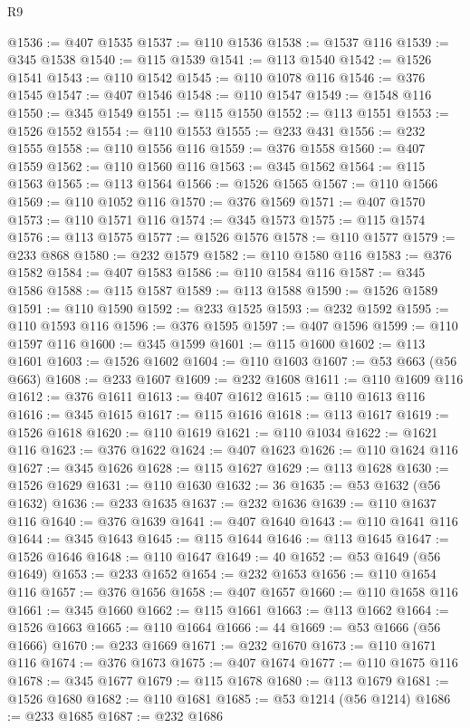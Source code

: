 \begin{lexlean}{R9}
\begin{coremodule}
@1536 := @407 @1535
@1537 := @110 @1536
@1538 := @1537 @116
@1539 := @345 @1538
@1540 := @115 @1539
@1541 := @113 @1540
@1542 := @1526 @1541
@1543 := @110 @1542
@1545 := @110 @1078 @116
@1546 := @376 @1545
@1547 := @407 @1546
@1548 := @110 @1547
@1549 := @1548 @116
@1550 := @345 @1549
@1551 := @115 @1550
@1552 := @113 @1551
@1553 := @1526 @1552
@1554 := @110 @1553
@1555 := @233 @431
@1556 := @232 @1555
@1558 := @110 @1556 @116
@1559 := @376 @1558
@1560 := @407 @1559
@1562 := @110 @1560 @116
@1563 := @345 @1562
@1564 := @115 @1563
@1565 := @113 @1564
@1566 := @1526 @1565
@1567 := @110 @1566
@1569 := @110 @1052 @116
@1570 := @376 @1569
@1571 := @407 @1570
@1573 := @110 @1571 @116
@1574 := @345 @1573
@1575 := @115 @1574
@1576 := @113 @1575
@1577 := @1526 @1576
@1578 := @110 @1577
@1579 := @233 @868
@1580 := @232 @1579
@1582 := @110 @1580 @116
@1583 := @376 @1582
@1584 := @407 @1583
@1586 := @110 @1584 @116
@1587 := @345 @1586
@1588 := @115 @1587
@1589 := @113 @1588
@1590 := @1526 @1589
@1591 := @110 @1590
@1592 := @233 @1525
@1593 := @232 @1592
@1595 := @110 @1593 @116
@1596 := @376 @1595
@1597 := @407 @1596
@1599 := @110 @1597 @116
@1600 := @345 @1599
@1601 := @115 @1600
@1602 := @113 @1601
@1603 := @1526 @1602
@1604 := @110 @1603
@1607 := @53 @663 (@56 @663)
@1608 := @233 @1607
@1609 := @232 @1608
@1611 := @110 @1609 @116
@1612 := @376 @1611
@1613 := @407 @1612
@1615 := @110 @1613 @116
@1616 := @345 @1615
@1617 := @115 @1616
@1618 := @113 @1617
@1619 := @1526 @1618
@1620 := @110 @1619
@1621 := @110 @1034
@1622 := @1621 @116
@1623 := @376 @1622
@1624 := @407 @1623
@1626 := @110 @1624 @116
@1627 := @345 @1626
@1628 := @115 @1627
@1629 := @113 @1628
@1630 := @1526 @1629
@1631 := @110 @1630
@1632 := 36
@1635 := @53 @1632 (@56 @1632)
@1636 := @233 @1635
@1637 := @232 @1636
@1639 := @110 @1637 @116
@1640 := @376 @1639
@1641 := @407 @1640
@1643 := @110 @1641 @116
@1644 := @345 @1643
@1645 := @115 @1644
@1646 := @113 @1645
@1647 := @1526 @1646
@1648 := @110 @1647
@1649 := 40
@1652 := @53 @1649 (@56 @1649)
@1653 := @233 @1652
@1654 := @232 @1653
@1656 := @110 @1654 @116
@1657 := @376 @1656
@1658 := @407 @1657
@1660 := @110 @1658 @116
@1661 := @345 @1660
@1662 := @115 @1661
@1663 := @113 @1662
@1664 := @1526 @1663
@1665 := @110 @1664
@1666 := 44
@1669 := @53 @1666 (@56 @1666)
@1670 := @233 @1669
@1671 := @232 @1670
@1673 := @110 @1671 @116
@1674 := @376 @1673
@1675 := @407 @1674
@1677 := @110 @1675 @116
@1678 := @345 @1677
@1679 := @115 @1678
@1680 := @113 @1679
@1681 := @1526 @1680
@1682 := @110 @1681
@1685 := @53 @1214 (@56 @1214)
@1686 := @233 @1685
@1687 := @232 @1686

\end{coremodule}
\end{lexlean}
